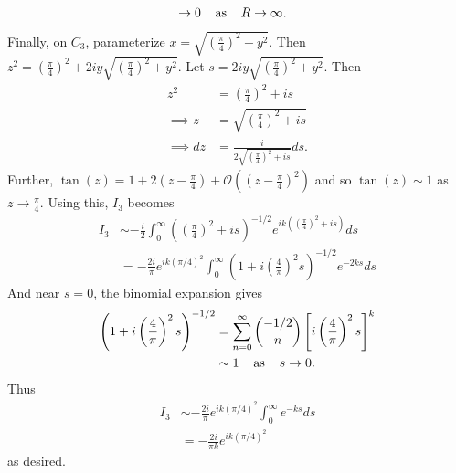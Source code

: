 \documentclass{article}
\begin{document}
\begin{itemize}
\begin{itemize}
\begin{align*}
            &\to 0 \hspace{0.4cm} \text{as} \hspace{0.4cm} R \to \infty.
        \end{align*}
        Finally, on $C_3$, parameterize $x = \sqrt{\left(\frac{\pi}{4}\right)^2 + y^2}$. Then $z^2 = \left(\frac{\pi}{4}\right)^2 + 2iy\sqrt{\left(\frac{\pi}{4}\right)^2 + y^2}$. Let $s = 2iy\sqrt{\left(\frac{\pi}{4}\right)^2 + y^2}$. Then
        \begin{align*}
            z^2 &= \left(\frac{\pi}{4}\right)^2 + is\\
            \implies z &= \sqrt{\left(\frac{\pi}{4}\right)^2 + is}\\
            \implies dz &= \frac{i}{2\sqrt{\left(\frac{\pi}{4}\right)^2 + is}}ds.
        \end{align*}
        Further, $\tan(z) = 1 + 2\left(z - \frac{\pi}{4}\right) + \mathcal{O}\left(\left(z - \frac{\pi}{4}\right)^2\right)$ and so $\tan(z) \sim 1$ as $z \to \frac{\pi}{4}$. Using this, $I_3$ becomes
        \begin{align*}
            I_3 &\sim -\frac{i}{2}\int_0^{\infty}\left(\left(\frac{\pi}{4}\right)^2 + is\right)^{-1/2}e^{ik\left(\left(\frac{\pi}{4}\right)^2 + is\right)}ds\\
            &= -\frac{2i}{\pi}e^{ik(\pi/4)^2}\int_0^{\infty}\left(1 + i\left(\frac{4}{\pi}\right)^2s\right)^{-1/2}e^{-2ks}ds
        \end{align*}
        And near $s = 0$, the binomial expansion gives
        \begin{align*}
            \left(1 + i\left(\frac{4}{\pi}\right)^2s\right)^{-1/2} &= \sum_{n = 0}^{\infty}{-1/2 \choose n}\left[i\left(\frac{4}{\pi}\right)^2s\right]^k\\
            &\sim 1 \hspace{0.4cm} \text{as} \hspace{0.4cm} s \to 0.
        \end{align*}
        Thus
        \begin{align*}
            I_3 &\sim -\frac{2i}{\pi}e^{ik(\pi/4)^2}\int_0^{\infty} e^{-ks}ds\\
            &= -\frac{2i}{\pi k}e^{ik(\pi/4)^2}
        \end{align*}
        as desired.
        
    \end{itemize}


\end{itemize}
\end{document}
